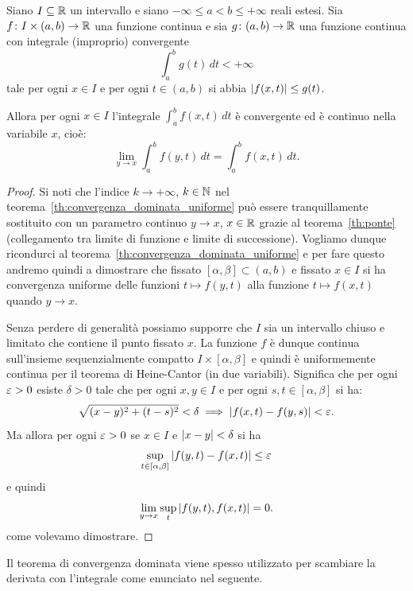 \begin{theorem}
  \label{th:convergenza_dominata}%
  \mymark{**}%
Siano $I\subseteq {\mathbb R}$ un intervallo e siano 
$-\infty \le a < b \le +\infty$ reali estesi.
Sia $f\colon I \times(a,b)\to {\mathbb R}$ una funzione continua 
e sia $g\colon(a,b)\to {\mathbb R}$ una funzione continua con integrale 
(improprio) convergente
\[
 \int_a^b g(t)\, dt < +\infty
\]
tale per ogni $x\in I$ e per ogni $t\in(a,b)$ si abbia ${\left|f(x,t)\right|} \le g(t)$.

Allora per ogni $x\in I$ l'integrale $\int_a^b f(x,t)\, dt$ è convergente ed è continuo 
nella variabile $x$, cioè:
\[
  \lim_{y\to x} \int_a^b f(y,t)  \, dt 
  = \int_a^b f(x,t)\, dt.
\]
\end{theorem}
%
\begin{proof}
Si noti che l'indice $k\to +\infty$, $k\in {\mathbb N}$ 
nel teorema~\ref{th:convergenza_dominata_uniforme} 
può essere tranquillamente sostituito con 
un parametro continuo $y\to x$, $x\in {\mathbb R}$
grazie al teorema~\ref{th:ponte} (collegamento tra limite 
di funzione e limite di successione).
Vogliamo dunque ricondurci al teorema~\ref{th:convergenza_dominata_uniforme} 
e per fare questo andremo quindi a dimostrare che fissato $[\alpha,\beta]\subset (a,b)$ 
e fissato $x\in I$ si ha convergenza uniforme 
delle funzioni $t\mapsto f(y,t)$ alla funzione $t\mapsto f(x,t)$
quando $y\to x$. 

Senza perdere di generalità possiamo supporre che $I$ sia un intervallo chiuso e limitato 
che contiene il punto fissato $x$. 
La funzione $f$ è dunque continua sull'insieme sequenzialmente compatto $I\times [\alpha,\beta]$ 
e quindi è uniformemente continua
per il teorema di Heine-Cantor (in due variabili).
Significa che per ogni $\varepsilon>0$ esiste $\delta>0$ tale che per ogni $x,y\in I$ 
e per ogni $s,t\in[\alpha,\beta]$ si ha:
\[
\sqrt{(x-y)^2+(t-s)^2} < \delta \implies {\left|f(x,t)-f(y,s)\right|} < \varepsilon.  
\]
Ma allora per ogni $\varepsilon>0$ se $x\in I$ e ${\left|x-y\right|} < \delta$ si ha 
\[
  \sup_{t\in\left[\alpha,\beta\right]} {\left|f(y,t)-f(x,t)\right|} \le \varepsilon
\]
e quindi
\[
  \lim_{y\to x}  \sup_t {\left|f(y,t), f(x,t)\right|} = 0.
\]
come volevamo dimostrare.
\end{proof}
%
Il teorema di convergenza dominata viene spesso utilizzato 
per scambiare la derivata con l'integrale come enunciato nel seguente.
%

